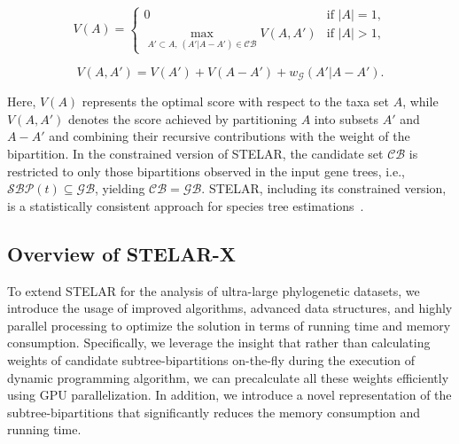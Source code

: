 \documentclass[10pt,a4paper]{article}
\begin{document}
\begin{equation}
V(A) = 
\begin{cases} 
0 & \text{if } |A| = 1, \\[6pt]
\max_{A' \subset A, \, (A'|A-A') \in \mathcal{CB}} V(A, A') & \text{if } |A| > 1,
\end{cases}
\label{eq:recurrence-relation}
\end{equation}

\begin{equation}
V(A, A') = V(A') + V(A - A') + w_{\mathcal{G}}(A'|A - A').
\end{equation}

Here, $V(A)$ represents the optimal score with respect to the taxa set $A$, while $V(A, A')$ denotes the score achieved by partitioning $A$ into subsets $A'$ and $A-A'$ and combining their recursive contributions with the weight of the bipartition. In the constrained version of STELAR, the candidate set $\mathcal{CB}$ is restricted to only those bipartitions observed in the input gene trees, i.e., $\mathcal{SBP}(t) \subseteq \mathcal{GB}$, yielding $\mathcal{CB} = \mathcal{GB}$. STELAR, including its constrained version, is a statistically consistent approach for species tree estimations~\cite{stelar}.



\subsection{Overview of STELAR-X}

To extend STELAR for the analysis of ultra-large phylogenetic datasets, we introduce the usage of improved algorithms, advanced data structures, and highly parallel processing to optimize the solution in terms of running time and memory consumption. Specifically, we leverage the insight that rather than calculating weights of candidate subtree-bipartitions on-the-fly during the execution of dynamic programming algorithm, we can precalculate all these weights efficiently using GPU parallelization. In addition, we introduce a novel representation of the subtree-bipartitions that significantly reduces the memory consumption and running time.
\end{document}
